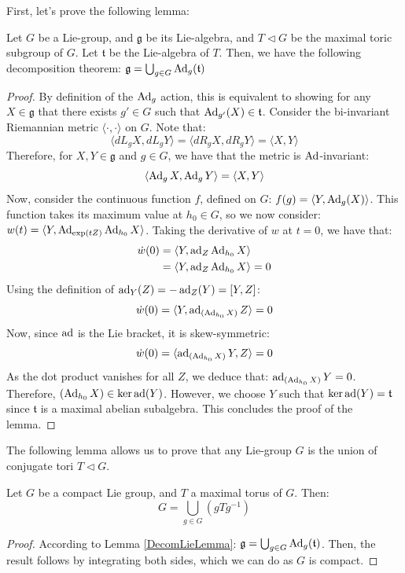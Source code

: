 First, let's prove the following lemma:
\begin{lemma}
\label{DecomLieLemma}
Let $G$ be a Lie-group, and $\mathfrak{g}$ be its Lie-algebra, and $T \lhd G$ be the maximal toric subgroup of $G$. Let $\mathfrak{t}$ be the Lie-algebra of $T$. Then, we have the following decomposition theorem: $\mathfrak{g} = \bigcup_{g \in G} \operatorname{Ad}_{g}(\mathfrak{t})$
\end{lemma}
\begin{proof}
By definition of the $\operatorname{Ad}_{g}$ action, this is equivalent to showing for any $X \in \mathfrak{g}$ that there exists $g' \in G$ such that $\operatorname{Ad}_{g'}(X) \in \mathfrak{t}$. Consider the bi-invariant Riemannian metric $\langle \cdot, \cdot \rangle$ on $G$. Note that:
\[
\langle dL_{g} X, dL_{g} Y \rangle = \langle dR_{g} X, dR_{g} Y \rangle = \langle X, Y \rangle
\]
Therefore, for $X, Y \in \mathfrak{g}$ and $g \in G$, we have that the metric is $\operatorname{Ad}$-invariant:
\[
\langle \operatorname{Ad}_{g} X, \operatorname{Ad}_{g} Y \rangle = \langle X, Y \rangle
\]
Now, consider the continuous function $f$, defined on $G$: $f(g) = \langle Y, \operatorname{Ad}_{g}(X) \rangle$. This function takes its maximum value at $h_{0} \in G$, so we now consider: $w(t) = \langle Y, \operatorname{Ad}_{\exp(tZ)} \operatorname{Ad}_{h_{0}} X \rangle$. Taking the derivative of $w$ at $t = 0$, we have that:
\begin{align}
\dot{w}(0) &= \langle Y, \operatorname{ad}_{Z} \operatorname{Ad}_{h_{0}} X \rangle\\
&= \langle Y, \operatorname{ad}_{Z} \operatorname{Ad}_{h_{0}} X \rangle = 0
\end{align}
Using the definition of $\operatorname{ad}_{Y}(Z) = -\operatorname{ad}_{Z}(Y) = [Y, Z]$:
\[
\dot{w}(0) = \langle Y, \operatorname{ad}_{(\operatorname{Ad}_{h_{0}} X)} Z \rangle = 0
\]
Now, since $\operatorname{ad}$ is the Lie bracket, it is skew-symmetric:
\[
\dot{w}(0) = \langle \operatorname{ad}_{(\operatorname{Ad}_{h_{0}} X)} Y, Z \rangle = 0
\]
As the dot product vanishes for all $Z$, we deduce that: $\operatorname{ad}_{(\operatorname{Ad}_{h_{0}} X)} Y = 0$. Therefore, $(\operatorname{Ad}_{h_{0}} X) \in \ker \operatorname{ad}(Y)$. However, we choose $Y$ such that $\ker \operatorname{ad}(Y) = \mathfrak{t}$ since $\mathfrak{t}$ is a maximal abelian subalgebra. This concludes the proof of the lemma.
\end{proof}
\begin{remark}
The following lemma allows us to prove that any Lie-group $G$ is the union of conjugate tori $T \lhd G$. 
\end{remark}

\begin{theorem}
Let $G$ be a compact Lie group, and $T$ a maximal torus of $G$. Then:
\begin{equation}
G = \bigcup_{g \in G} \left(gTg^{-1}\right) 
\end{equation} \end{theorem}
\begin{proof}
According to Lemma \ref{DecomLieLemma}: $\mathfrak{g} = \bigcup_{g \in G} \operatorname{Ad}_{g}(\mathfrak{t})$. Then, the result follows by integrating both sides, which we can do as $G$ is compact.
\end{proof}

